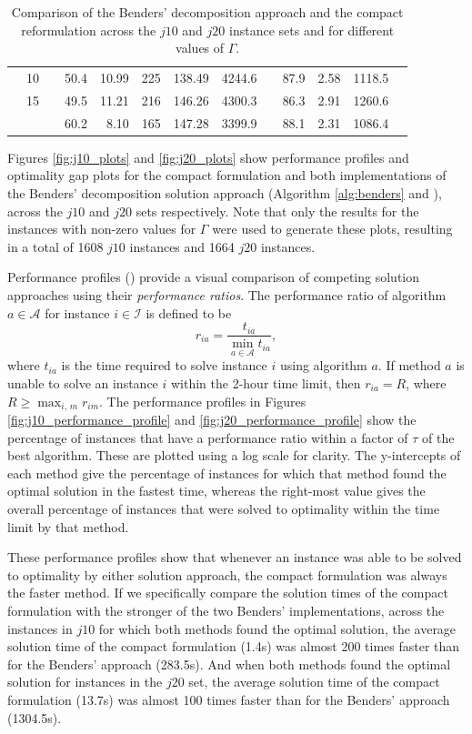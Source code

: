\documentclass[a4paper,abstracton]{scrartcl}
\begin{document}
\begin{table}[h]
{\begin{tabular}{lrrrrrrrrrrrr}
			       & 10   & & 50.4     & 10.99    & 225          & 138.49        & 4244.6       & & 87.9       & 2.58       & 1118.5          \\
			       & 15   & & 49.5     & 11.21    & 216          & 146.26        & 4300.3       & & 86.3       & 2.91       & 1260.6          \\
		     \cline{4-8} \cline{10-12}
			       &      & & 60.2	   & 8.10     & 165	     & 147.28	     & 3399.9       & & 88.1       & 2.31       & 1086.4          \\
		     \hline \hline
\end{tabular}
}
\caption{Comparison of the Benders' decomposition approach and the compact reformulation across the $j10$ and $j20$ instance sets and for different values of $\Gamma$.}
\label{table:benders_vs_compact}
\end{table}

Figures \ref{fig:j10_plots} and \ref{fig:j20_plots} show performance profiles and optimality gap plots for the compact formulation and both implementations of the Benders' decomposition solution approach (Algorithm \ref{alg:benders} and \cite{balouka2021robust}), across the $j10$ and $j20$ sets respectively. Note that only the results for the instances with non-zero values for $\Gamma$ were used to generate these plots, resulting in a total of 1608 $j10$ instances and 1664 $j20$ instances. 

Performance profiles (\cite{dolan2002benchmarking}) provide a visual comparison of competing solution approaches using their \textit{performance ratios}. The performance ratio of algorithm $a\in \mathcal{A}$ for instance $i\in \mathcal{I}$ is defined to be 
$$r_{ia}=\frac{t_{ia}}{\min_{a\in \mathcal{A}} t_{ia}},$$
where $t_{ia}$ is the time required to solve instance $i$ using algorithm $a$. If method $a$ is unable to solve an instance $i$ within the 2-hour time limit, then $r_{ia}=R$, where $R\geq \max_{i,\,m}r_{im}$. The performance profiles in Figures \ref{fig:j10_performance_profile} and \ref{fig:j20_performance_profile} show the percentage of instances that have a performance ratio within a factor of $\tau$ of the best algorithm. These are plotted using a log scale for clarity. The y-intercepts of each method give the percentage of instances for which that method found the optimal solution in the fastest time, whereas the right-most value gives the overall percentage of instances that were solved to optimality within the time limit by that method.

These performance profiles show that whenever an instance was able to be solved to optimality by either solution approach, the compact formulation was always the faster method. If we specifically compare the solution times of the compact formulation with the stronger of the two Benders' implementations, across the instances in $j10$ for which both methods found the optimal solution, the average solution time of the compact formulation (1.4s) was almost 200 times faster than for the Benders' approach (283.5s). And when both methods found the optimal solution for instances in the $j20$ set, the average solution time of the compact formulation (13.7s) was almost 100 times faster than for the Benders' approach (1304.5s). 
\end{document}
